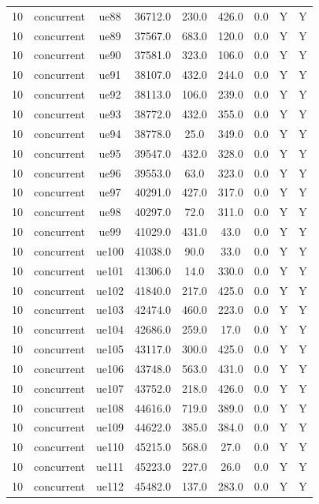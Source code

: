 \begin{table}[ht]
\begin{tabular}{|c|c|c|c|c|c|c|c|c|}
10 & concurrent & ue88 & 36712.0 & 230.0 & 426.0 & 0.0 & Y & Y \\
10 & concurrent & ue89 & 37567.0 & 683.0 & 120.0 & 0.0 & Y & Y \\
10 & concurrent & ue90 & 37581.0 & 323.0 & 106.0 & 0.0 & Y & Y \\
10 & concurrent & ue91 & 38107.0 & 432.0 & 244.0 & 0.0 & Y & Y \\
10 & concurrent & ue92 & 38113.0 & 106.0 & 239.0 & 0.0 & Y & Y \\
10 & concurrent & ue93 & 38772.0 & 432.0 & 355.0 & 0.0 & Y & Y \\
10 & concurrent & ue94 & 38778.0 & 25.0 & 349.0 & 0.0 & Y & Y \\
10 & concurrent & ue95 & 39547.0 & 432.0 & 328.0 & 0.0 & Y & Y \\
10 & concurrent & ue96 & 39553.0 & 63.0 & 323.0 & 0.0 & Y & Y \\
10 & concurrent & ue97 & 40291.0 & 427.0 & 317.0 & 0.0 & Y & Y \\
10 & concurrent & ue98 & 40297.0 & 72.0 & 311.0 & 0.0 & Y & Y \\
10 & concurrent & ue99 & 41029.0 & 431.0 & 43.0 & 0.0 & Y & Y \\
10 & concurrent & ue100 & 41038.0 & 90.0 & 33.0 & 0.0 & Y & Y \\
10 & concurrent & ue101 & 41306.0 & 14.0 & 330.0 & 0.0 & Y & Y \\
10 & concurrent & ue102 & 41840.0 & 217.0 & 425.0 & 0.0 & Y & Y \\
10 & concurrent & ue103 & 42474.0 & 460.0 & 223.0 & 0.0 & Y & Y \\
10 & concurrent & ue104 & 42686.0 & 259.0 & 17.0 & 0.0 & Y & Y \\
10 & concurrent & ue105 & 43117.0 & 300.0 & 425.0 & 0.0 & Y & Y \\
10 & concurrent & ue106 & 43748.0 & 563.0 & 431.0 & 0.0 & Y & Y \\
10 & concurrent & ue107 & 43752.0 & 218.0 & 426.0 & 0.0 & Y & Y \\
10 & concurrent & ue108 & 44616.0 & 719.0 & 389.0 & 0.0 & Y & Y \\
10 & concurrent & ue109 & 44622.0 & 385.0 & 384.0 & 0.0 & Y & Y \\
10 & concurrent & ue110 & 45215.0 & 568.0 & 27.0 & 0.0 & Y & Y \\
10 & concurrent & ue111 & 45223.0 & 227.0 & 26.0 & 0.0 & Y & Y \\
10 & concurrent & ue112 & 45482.0 & 137.0 & 283.0 & 0.0 & Y & Y \\

\end{tabular}
\end{table}
